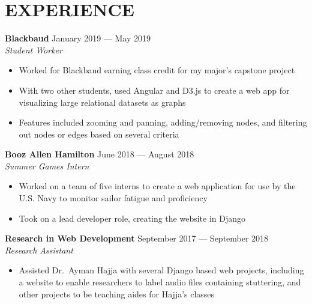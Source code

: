 \documentclass[letterpaper,14pt]{extarticle}
\begin{document}
\section*{EXPERIENCE}
\textbf{Blackbaud}
  \hspace*{\fill}
  \textcolor{color2}{January 2019 --- May 2019}
  \\ 
  \textcolor{color2}{
    \textit{
      \qquad{}Student Worker
    }
  }

  \begin{itemize}[itemsep=0pt, topsep=2pt]
    \item{Worked for Blackbaud earning class credit for my major's capstone project}
    \item{With two other students, used Angular and D3.js to create a web app for visualizing large relational datasets as graphs}    
    \item{Features included zooming and panning, adding/removing nodes, and filtering out nodes or edges based on several criteria}
  \end{itemize}


\textbf{Booz Allen Hamilton}
  \hspace*{\fill}
  \textcolor{color2}{June 2018 --- August 2018}
  \\ 
  \textcolor{color2}{
    \textit{
      \qquad{} Summer Games Intern
    }
  }

  \begin{itemize}[itemsep=0pt, topsep=2pt]
    \item{Worked on a team of five interns to create a web application for use by the U.S. Navy to monitor sailor fatigue and proficiency}
    \item{Took on a lead developer role, creating the website in Django} \end{itemize}

  \textbf{Research in Web Development}
  \hspace*{\fill}
  \textcolor{color2}{September 2017 --- September 2018}
  \\ 
  \textcolor{color2}{
    \textit{
      \qquad{} Research Assistant
    }
  }

  \begin{itemize}[itemsep=0pt, topsep=2pt]
    \item{Assisted Dr.\ Ayman Hajja with several Django based web projects, including a website to enable researchers to label audio files containing stuttering, and other projects to be teaching aides for Hajja’s classes}
  \end{itemize}
\end{document}
